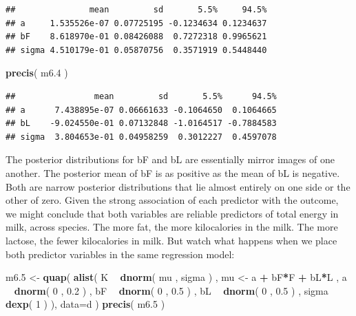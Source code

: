 \documentclass[
]{article}
\newenvironment{Shaded}{\begin{snugshade}}{\end{snugshade}}
\newcommand{\DataTypeTok}[1]{\textcolor[rgb]{0.13,0.29,0.53}{#1}}
\newcommand{\DecValTok}[1]{\textcolor[rgb]{0.00,0.00,0.81}{#1}}
\newcommand{\FloatTok}[1]{\textcolor[rgb]{0.00,0.00,0.81}{#1}}
\newcommand{\KeywordTok}[1]{\textcolor[rgb]{0.13,0.29,0.53}{\textbf{#1}}}
\newcommand{\NormalTok}[1]{#1}
\newcommand{\OperatorTok}[1]{\textcolor[rgb]{0.81,0.36,0.00}{\textbf{#1}}}
\newcommand{\StringTok}[1]{\textcolor[rgb]{0.31,0.60,0.02}{#1}}
\begin{document}
\begin{verbatim}
##               mean         sd       5.5%     94.5%
## a     1.535526e-07 0.07725195 -0.1234634 0.1234637
## bF    8.618970e-01 0.08426088  0.7272318 0.9965621
## sigma 4.510179e-01 0.05870756  0.3571919 0.5448440
\end{verbatim}

\begin{Shaded}
\begin{Highlighting}[]
\KeywordTok{precis}\NormalTok{( m6}\FloatTok{.4}\NormalTok{ )}
\end{Highlighting}
\end{Shaded}

\begin{verbatim}
##                mean         sd       5.5%      94.5%
## a      7.438895e-07 0.06661633 -0.1064650  0.1064665
## bL    -9.024550e-01 0.07132848 -1.0164517 -0.7884583
## sigma  3.804653e-01 0.04958259  0.3012227  0.4597078
\end{verbatim}

The posterior distributions for bF and bL are essentially mirror images
of one another. The posterior mean of bF is as positive as the mean of
bL is negative. Both are narrow posterior distributions that lie almost
entirely on one side or the other of zero. Given the strong association
of each predictor with the outcome, we might conclude that both
variables are reliable predictors of total energy in milk, across
species. The more fat, the more kilocalories in the milk. The more
lactose, the fewer kilocalories in milk. But watch what happens when we
place both predictor variables in the same regression model:

\begin{Shaded}
\begin{Highlighting}[]
\NormalTok{m6}\FloatTok{.5}\NormalTok{ <-}\StringTok{ }\KeywordTok{quap}\NormalTok{(}
    \KeywordTok{alist}\NormalTok{(}
\NormalTok{        K }\OperatorTok{~}\StringTok{ }\KeywordTok{dnorm}\NormalTok{( mu , sigma ) ,}
\NormalTok{        mu <-}\StringTok{ }\NormalTok{a }\OperatorTok{+}\StringTok{ }\NormalTok{bF}\OperatorTok{*}\NormalTok{F }\OperatorTok{+}\StringTok{ }\NormalTok{bL}\OperatorTok{*}\NormalTok{L ,}
\NormalTok{        a }\OperatorTok{~}\StringTok{ }\KeywordTok{dnorm}\NormalTok{( }\DecValTok{0}\NormalTok{ , }\FloatTok{0.2}\NormalTok{ ) ,}
\NormalTok{        bF }\OperatorTok{~}\StringTok{ }\KeywordTok{dnorm}\NormalTok{( }\DecValTok{0}\NormalTok{ , }\FloatTok{0.5}\NormalTok{ ) ,}
\NormalTok{        bL }\OperatorTok{~}\StringTok{ }\KeywordTok{dnorm}\NormalTok{( }\DecValTok{0}\NormalTok{ , }\FloatTok{0.5}\NormalTok{ ) ,}
\NormalTok{        sigma }\OperatorTok{~}\StringTok{ }\KeywordTok{dexp}\NormalTok{( }\DecValTok{1}\NormalTok{ )}
\NormalTok{),}
    \DataTypeTok{data=}\NormalTok{d )}
\KeywordTok{precis}\NormalTok{( m6}\FloatTok{.5}\NormalTok{ )}
\end{Highlighting}
\end{Shaded}
\end{document}
